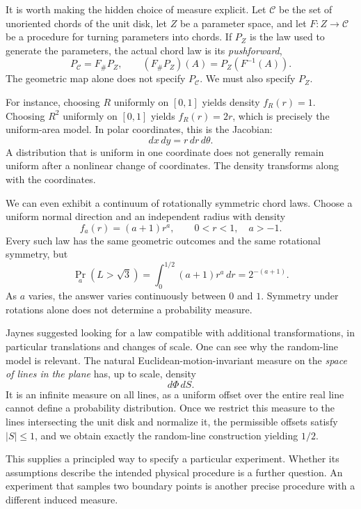 It is worth making the hidden choice of measure explicit. Let \(\mathcal C\) be the set of unoriented chords of the unit disk, let \(Z\) be a parameter space, and let \(F:Z\to\mathcal C\) be a procedure for turning parameters into chords. If \(P_Z\) is the law used to generate the parameters, the actual chord law is its \emph{pushforward},
\begin{equation}
 P_{\mathcal C}=F_\#P_Z,
 \qquad
 (F_\#P_Z)(A)=P_Z(F^{-1}(A)).
 \label{eq:N20261105-pushforward}
\end{equation}
The geometric map alone does not specify \(P_{\mathcal C}\). We must also specify \(P_Z\).

For instance, choosing \(R\) uniformly on \([0,1]\) yields density \(f_R(r)=1\). Choosing \(R^2\) uniformly on \([0,1]\) yields \(f_R(r)=2r\), which is precisely the uniform-area model. In polar coordinates, this is the Jacobian:
\[
 dx\,dy=r\,dr\,d\theta.
\]
A distribution that is uniform in one coordinate does not generally remain uniform after a nonlinear change of coordinates. The density transforms along with the coordinates.

We can even exhibit a continuum of rotationally symmetric chord laws. Choose a uniform normal direction and an independent radius with density
\[
 f_a(r)=(a+1)r^a,\qquad0<r<1,\quad a>-1.
\]
Every such law has the same geometric outcomes and the same rotational symmetry, but
\[
 \Pr_a(L>\sqrt3)=\int_0^{1/2}(a+1)r^a\,dr
 =2^{-(a+1)}.
\]
As \(a\) varies, the answer varies continuously between \(0\) and \(1\). Symmetry under rotations alone does not determine a probability measure.

Jaynes suggested looking for a law compatible with additional transformations, in particular translations and changes of scale. One can see why the random-line model is relevant. The natural Euclidean-motion-invariant measure on the \emph{space of lines in the plane} has, up to scale, density
\[
 d\Phi\,dS.
\]
It is an infinite measure on all lines, as a uniform offset over the entire real line cannot define a probability distribution. Once we restrict this measure to the lines intersecting the unit disk and normalize it, the permissible offsets satisfy \(|S|\leq1\), and we obtain exactly the random-line construction yielding \(1/2\).

This supplies a principled way to specify a particular experiment. Whether its assumptions describe the intended physical procedure is a further question. An experiment that samples two boundary points is another precise procedure with a different induced measure.

